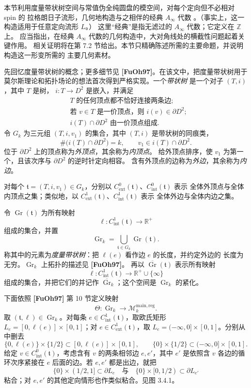 本节利用度量带状树空间与常值伪全纯圆盘的模空间，对每个定向但不必相对 spin 的
拉格朗日子流形，几何地构造与之相伴的经典 $A_\infty$ 代数
。（事实上，这一构造适用于任意定向流形 $L$。）
这里“经典”是指无滤过的 $A_\infty$ 代数；它定义在 $\mathbb Z$ 上。
应当指出，在经典 $A_\infty$ 代数的几何构造中，大对角线处的横截性问题起着关键作用。
相关证明将在第 7.2 节给出。本节只精确陈述所需的主要命题，并说明构造这一形变所需的
主要几何素材。

先回忆度量带状树的概念；更多细节见 \textbf{[FuOh97]}。在该文中，把度量带状树用于
莫尔斯理论和拓扑场论的想法首次得到严格实现。一个\emph{带状树}
是一个对子 $(T,i)$，其中 $T$ 是树，
$i\colon T\to D^2$ 是嵌入，并满足
\begin{align}
  &T\text{ 的任何顶点都不恰好连接两条边};
  \tag{3.4.1.1}\label{eq:3-4-1-1}\\
  &\text{若 }v\in T\text{ 是一价顶点，则 }i(v)\in\partial D^2;
  \tag{3.4.1.2}\label{eq:3-4-1-2}\\
  &i(T)\cap\partial D^2\text{ 由一价顶点组成}.
  \tag{3.4.1.3}\label{eq:3-4-1-3}
\end{align}
令 $G_k$ 为三元组 $(T,i,v_1)$ 的集合，其中 $(T,i)$ 是带状树的同痕类，
\[
  \#\bigl(i(T)\cap\partial D^2\bigr)=k,\qquad
  v_1\in i(T)\cap\partial D^2.
\]
位于 $\partial D^2$ 上的顶点称为\emph{外顶点}，其余称为\emph{内顶点}。
给外顶点排序，使 $v_1$ 为第一个，且该次序与 $\partial D^2$ 的逆时针定向相容。
含有外顶点的边称为\emph{外边}，其余称为\emph{内边}。

对每个 $\mathfrak t=(T,i,v_1)\in G_k$，分别以
$C_{\mathrm{ext}}^0(\mathfrak t)$、$C_{\mathrm{int}}^0(\mathfrak t)$ 表示
全体外顶点与全体内顶点之集；类似地，以
$C_{\mathrm{ext}}^1(\mathfrak t)$、$C_{\mathrm{int}}^1(\mathfrak t)$ 表示
全体外边与全体内边之集。

令 $\operatorname{Gr}(\mathfrak t)$ 为所有映射
\[
  \ell\colon C_{\mathrm{int}}^1(\mathfrak t)\longrightarrow\mathbb R^+
\]
组成的集合，并置
\[
  \operatorname{Gr}_k=\bigcup_{\mathfrak t\in G_k}
  \operatorname{Gr}(\mathfrak t).
\]
称其中的元素为\emph{度量带状树}：把 $\ell(e)$ 看作边 $e$ 的长度，并约定外边的
长度为无穷。$\operatorname{Gr}_k$ 上拓扑的描述见 \textbf{[FuOh97]}。
再以 $\overline{\operatorname{Gr}}(\mathfrak t)$ 表示所有映射
\[
  \ell\colon C_{\mathrm{int}}^1(\mathfrak t)
  \longrightarrow\mathbb R^+\cup\{\infty\}
\]
组成的集合，并把它们的并记作
$\overline{\operatorname{Gr}}_k$；这个空间是
$\operatorname{Gr}_k$ 的紧化。

下面依照 \textbf{[FuOh97]} 第 10 节定义映射
\[
  \Theta\colon\operatorname{Gr}_k
  \longrightarrow\mathcal M_k^{\mathrm{main,reg}}.
\]
取 $(\mathfrak t,\ell)\in\operatorname{Gr}_k$。对每条
$e\in C_{\mathrm{int}}^1(\mathfrak t)$，取欧氏矩形
$L_e=[0,\ell(e)]\times[0,1]$；对
$e\in C_{\mathrm{ext}}^1(\mathfrak t)$，取
$L_e=(-\infty,0]\times[0,1]$。分别从中删去
\[
  \{0,\ell(e)\}\times\{1/2\}
  \subset[0,\ell(e)]\times[0,1],
  \qquad
  \{0\}\times\{1/2\}
  \subset(-\infty,0]\times[0,1].
\]
给定 $v\in C_{\mathrm{int}}^0(\mathfrak t)$，考虑含有 $v$ 的两条相邻边
$e,e'$，其中 $e'$ 是依照含 $v$ 各边的循环次序紧接在 $e$ 后面的边。若
$e,e'$ 都是出边，就把
\[
  \{0\}\times(1/2,1]\subset\partial L_e
  \quad\text{与}\quad
  \{0\}\times[0,1/2)\subset\partial L_{e'}
\]
粘合；对 $e,e'$ 的其他定向情形也作类似粘合。见图 3.4.1。

